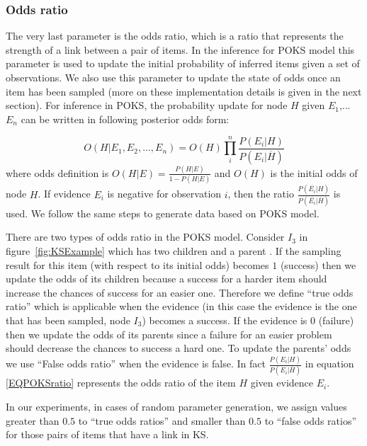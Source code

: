 \subsubsection{Odds ratio}

The very last parameter is the odds ratio, which is a ratio that represents the strength of a link between a pair of items. In the inference for POKS model this parameter is used to update the initial probability of inferred items given a set of observations. We also use this parameter to update the state of odds once an item has been sampled (more on these implementation details is given in the next section).
For inference in POKS, the probability update for node $H$ given $E_1$,... $E_n$ can be written in following posterior odds form:

\begin{equation}
O(H|E_1,E_2, ... , E_n) = O(H) \prod_{i}^{n} \frac{P(E_i|H)}{P(E_i | \overline{H})}
\label{EQPOKSratio}
\end{equation}
where odds definition is $O(H|E) = \frac{P(H|E)}{1-P(H|E)}$ and $O(H)$ is the initial odds of node $H$. If evidence $E_i$ is negative for observation $i$, then the ratio $\frac{P(\overline{E_i}|H)}{P(\overline{E_i}|\overline{H})}$ is used. We follow the same steps to generate data based on POKS model. 

There are two types of odds ratio in the POKS model. Consider $I_{3}$ in figure~\ref{fig:KSExample} which has two children and a parent . If the sampling result for this item (with respect to its initial odds) becomes $1$ (success) then we update the odds of its children because a success for a harder item should increase the chances of success for an easier one. Therefore we define ``true odds ratio'' which is applicable when the evidence (in this case the evidence is the one that has been sampled,  node $I_{3}$) becomes a success. If the evidence is $0$ (failure) then we update the odds of its parents since a failure for an easier problem should decrease the chances to success a hard one. To update the parents' odds we use ``False odds ratio'' when the evidence is false. In fact $\frac{P(E_i|H)}{P(E_i | \overline{H})}$ in equation \ref{EQPOKSratio} represents the odds ratio of the item $H$ given evidence $E_i$. 

In our experiments, in cases of random parameter generation, we assign values greater than $0.5$ to ``true odds ratios'' and smaller than $0.5$ to ``false odds ratios'' for those pairs of items that have a link in KS. 

